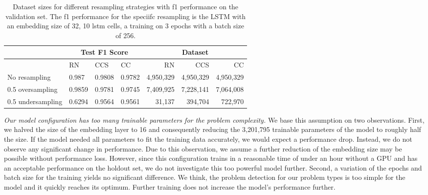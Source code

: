 \begin{table}[]
    \tabcolsep=0.11cm
    \begin{tabularx}{\textwidth}{lXXX|rrr}
    \toprule
                        & \multicolumn{3}{c}{Test F1 Score} & \multicolumn{3}{c}{Dataset}   \\ \midrule
                        & RN        & CCS        & CC     & RN            & CCS         & CC          \\ \midrule
    No resampling     &  0.987   &  0.9808    &  0.9782  &  4,950,329    & 4,950,329   & 4,950,329   \\
    0.5 oversampling  &  0.9859   &  0.9781   &  0.9745  &  7,409,925    & 7,228,141   & 7,064,008   \\
    0.5 undersampling &  0.6294   &  0.9564   &  0.9561  &  31,137       & 394,704     & 722,970     \\ \bottomrule
    \end{tabularx}
    \caption{Dataset sizes for different resampling strategies with f1 performance on the validation set. The f1 performance for the speciifc resampling is the LSTM with an embedding size of 32, 10 lstm cells, a training on 3 epochs with a batch size of 256.}
    \label{tab:resampling_size_performance_lstm}
\end{table}


\textit{Our model configuration has too many trainable parameters for the problem complexity.} We base this assumption on two observations. First, we halved the size of the embedding layer to 16 and consequently reducing the 3,201,795 trainable parameters of the model to roughly half the size. If the model needed all parameters to fit the training data accurately, we would expect a performance drop. Instead, we do not observe any significant change in performance. Due to this observation, we assume a further reduction of the embedding size may be possible without performance loss. However, since this configuration trains in a reasonable time of under an hour without a GPU and has an acceptable performance on the holdout set, we do not investigate this too powerful model further.
Second, a variation of the epochs and batch size for the training yields no significant difference. We think, the problem detection for our problem types is too simple for the model and it quickly reaches its optimum. Further training does not increase the model's performance further. 

\begin{center}
\end{center}

